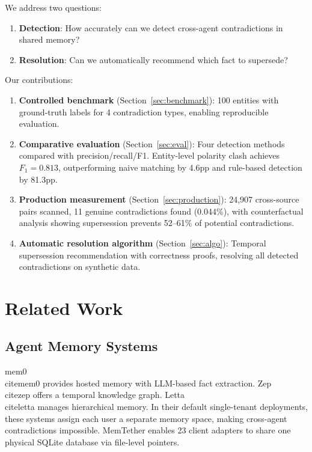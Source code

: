 \documentclass{article}
\begin{document}
We address two questions:
\begin{enumerate}
\item \textbf{Detection}: How accurately can we detect cross-agent contradictions in shared memory?
\item \textbf{Resolution}: Can we automatically recommend which fact to supersede?
\end{enumerate}

Our contributions:
\begin{enumerate}
\item \textbf{Controlled benchmark} (Section~\ref{sec:benchmark}): 100 entities with ground-truth labels for 4 contradiction types, enabling reproducible evaluation.
\item \textbf{Comparative evaluation} (Section~\ref{sec:eval}): Four detection methods compared with precision/recall/F1. Entity-level polarity clash achieves $F_1 = 0.813$, outperforming naive matching by 4.6pp and rule-based detection by 81.3pp.
\item \textbf{Production measurement} (Section~\ref{sec:production}): 24{,}907 cross-source pairs scanned, 11 genuine contradictions found (0.044\%), with counterfactual analysis showing supersession prevents 52--61\% of potential contradictions.
\item \textbf{Automatic resolution algorithm} (Section~\ref{sec:algo}): Temporal supersession recommendation with correctness proofs, resolving all detected contradictions on synthetic data.
\end{enumerate}

\section{Related Work}
\label{sec:related}

\subsection{Agent Memory Systems}
mem0~\\cite{mem0} provides hosted memory with LLM-based fact extraction. Zep~\\cite{zep} offers a temporal knowledge graph. Letta~\\cite{letta} manages hierarchical memory. In their default single-tenant deployments, these systems assign each user a separate memory space, making cross-agent contradictions impossible. MemTether enables 23 client adapters to share one physical SQLite database via file-level pointers.
\end{document}
